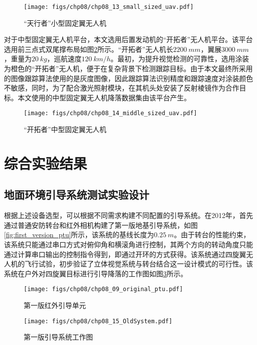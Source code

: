 \begin{figure}[!ht]
	\centering
	\texttt{[image: figs/chp08/chp08\_13\_small\_sized\_uav.pdf]}	
	\caption{“天行者”小型固定翼无人机}
	\label{fig:chp08_13_small_sized_uav}
\end{figure}

对于中型固定翼无人机平台，本文选用后置发动机的“开拓者”无人机平台。该平台选用前三点式双尾撑布局如图\ref{fig:chp08_14_middle_sized_uav}所示。“开拓者”无人机长$2200\ mm$，翼展$3000\ mm$，重量为$20\ kg$，巡航速度$120\ km/h$。最初，为提升视觉检测的可靠性，选用涂装为橙色的“开拓者”无人机，便于在复杂背景下检测跟踪目标。由于本文最终所采用的图像跟踪算法使用的是灰度图像，因此跟踪算法识别精度和跟踪速度对涂装颜色不敏感，同时，为了配合激光照射模块，在其机头处安装了反射棱镜作为合作目标。本文使用的中型固定翼无人机降落数据集由该平台产生。

\begin{figure}[!ht]
	\centering
	\texttt{[image: figs/chp08/chp08\_14\_middle\_sized\_uav.pdf]}	
	\caption{“开拓者”中型固定翼无人机}
	\label{fig:chp08_14_middle_sized_uav}
\end{figure}





\section{综合实验结果}
\subsection{地面环境引导系统测试实验设计}
根据上述设备选型，可以根据不同需求构建不同配置的引导系统。在2012年，首先通过普通安防转台和红外相机构建了第一版地基引导系统，如图\ref{fig:first_version_ptu}所示，该系统的基线长度为$0.25\ m$。由于转台的性能约束，该系统只能通过串口方式对俯仰角和横滚角进行控制，其两个方向的转动角度只能通过计算串口输出的控制指令得到，即通过开环的方式获得。该系统通过四旋翼无人机的飞行试验，初步验证了立体视觉系统与转台结合这一设计模式的可行性。该系统在户外对四旋翼目标进行引导降落的工作图如图\ref{fig:first_version_ptu_2}所示。

\begin{figure}[!t]
	\begin{minipage}{0.5\textwidth}
		\centering
		\texttt{[image: figs/chp08/chp08\_09\_original\_ptu.pdf]}	
		\caption{第一版红外引导单元}
		\label{fig:first_version_ptu}
	\end{minipage}\hfill
	\begin{minipage}{0.5\textwidth}
		\centering
		\texttt{[image: figs/chp08/chp08\_15\_OldSystem.pdf]}	
		\caption{第一版引导系统工作图}
		\label{fig:first_version_ptu_2}
	\end{minipage}
\end{figure}


